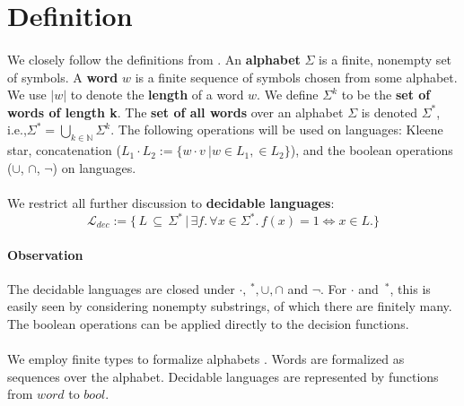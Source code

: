 \documentclass[11pt,a4paper,oneside]{book}
\begin{document}
    \section{Definition}
        \paragraph{}
        We closely follow the definitions from \cite{DBLP:books/daglib/0011126}.
        An \textbf{alphabet} $\Sigma$ is a finite, nonempty set of symbols. 
        A \textbf{word} $w$ is a finite sequence of symbols chosen from some alphabet. 
        We use $|w|$ to denote the \textbf{length} of a word $w$. 
        We define $\Sigma^k$ to be the \textbf{set of words of length k}.
        The \textbf{set of all words} over an alphabet $\Sigma$ is denoted $\Sigma^*$, i.e.,$\Sigma^* = \bigcup_{k \in \mathbb{N}} \Sigma^k$.
        The following operations will be used on languages: Kleene star, concatenation ($L_1 \cdot L_2 := \{w \cdot v\ \vert w \in L_1,  \in L_2\}$), and the boolean operations ($\cup$, $\cap$, $\neg$) on languages.

        
        \paragraph{} We restrict all further discussion to \textbf{decidable languages}:
        \[
            \mathcal{L}_{dec} := \{ \, L \, \subseteq \, \Sigma^* \, 
                \vert \, \exists f. \, \forall x \in \Sigma^*. \, f(x) = 1 \Leftrightarrow  x \in L. \}
        \] 

        \paragraph{Observation} 
            The decidable languages are closed under $\cdot, \,^*, \cup, \cap$ and $\neg$. 
            For $\cdot$ and $\,^*$, this is easily seen by considering nonempty substrings, of which there are finitely many. 
            The boolean operations can be applied directly to the decision functions.

        \paragraph{} 
            We employ finite types to formalize alphabets . 
            Words are formalized as sequences over the alphabet.
            Decidable languages are represented by functions from $word$ to $bool$.
\end{document}
